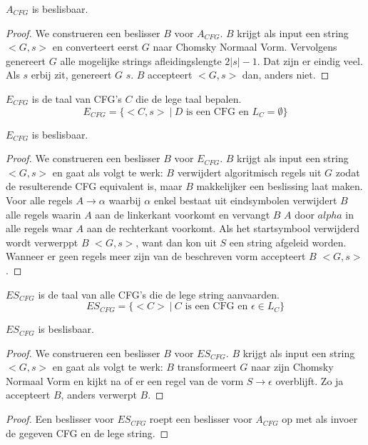 \documentclass[main.tex]{subfiles}
\begin{document}
\begin{st}
  \label{st:a-cfg-besl}
  $A_{CFG}$ is beslisbaar.

  \begin{proof}
    We construeren een beslisser $B$ voor $A_{CFG}$.
    $B$ krijgt als input een string $<G,s>$ en converteert eerst $G$ naar Chomsky Normaal Vorm.
    Vervolgens genereert $G$ alle mogelijke strings afleidingslengte $2|s| - 1$.
    Dat zijn er eindig veel.
    Als $s$ erbij zit, genereert $G$ $s$.
    $B$ accepteert $<G,s>$ dan, anders niet.
  \end{proof}
\end{st}

\begin{de}
  \label{de:e-cfg}
  $E_{CFG}$ is de taal van CFG's $C$ die de lege taal bepalen.
  \[ E_{CFG} = \{ <C,s>\ |\ D \text{ is een CFG en } L_{C} = \emptyset \} \]
\end{de}

\begin{st}
  \label{st:e-cfg-besl}
  $E_{CFG}$ is beslisbaar.

  \begin{proof}
    We construeren een beslisser $B$ voor $E_{CFG}$.
    $B$ krijgt als input een string $<G,s>$ en gaat als volgt te werk:
    $B$ verwijdert algoritmisch regels uit $G$ zodat de resulterende CFG equivalent is, maar $B$ makkelijker een beslissing laat maken.
    Voor alle regels $A \rightarrow \alpha$ waarbij $\alpha$ enkel bestaat uit eindsymbolen verwijdert $B$ alle regels waarin $A$ aan de linkerkant voorkomt en vervangt $B$ $A$ door $alpha$ in alle regels waar $A$ aan de rechterkant voorkomt.
    Als het startsymbool verwijderd wordt verwerppt $B$ $<G,s>$, want dan kon uit $S$ een string afgeleid worden.
    Wanneer er geen regels meer zijn van de beschreven vorm accepteert $B$ $<G,s>$.
  \end{proof}
\end{st}

\begin{de}
  \label{de:es-cfg}
  $ES_{CFG}$ is de taal van alle CFG's die de lege string aanvaarden.
  \[ ES_{CFG} = \{ <C> \ |\ C \text{ is een CFG en } \epsilon \in L_{C}\} \]
\end{de}

\begin{st}
  \label{st:es-cfg-besl}
  $ES_{CFG}$ is beslisbaar.

  \begin{proof}
    We construeren een beslisser $B$ voor $ES_{CFG}$.
    $B$ krijgt als input een string $<G,s>$ en gaat als volgt te werk:
    $B$ transformeert $G$ naar zijn Chomsky Normaal Vorm en kijkt na of er een regel van de vorm $S \rightarrow \epsilon$ overblijft.
    Zo ja accepteert $B$, anders verwerpt $B$.
  \end{proof}

  \begin{proof}
    Een beslisser voor $ES_{CFG}$ roept een beslisser voor $A_{CFG}$ op met als invoer de gegeven CFG en de lege string.
  \end{proof}
\end{st}
\end{document}
